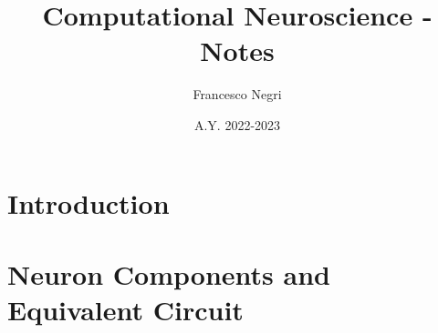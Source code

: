 \documentclass[12pt]{article}
\title{Computational Neuroscience - Notes}
\author{Francesco Negri}
\date{A.Y. 2022-2023}
\begin{document}
\maketitle

\tableofcontents
\newpage

\section{Introduction}
\graphicspath{ {./images/01/} }

\newpage

\section{Neuron Components and Equivalent Circuit}
\graphicspath{ {./images/02/} }

\newpage
\end{document}
